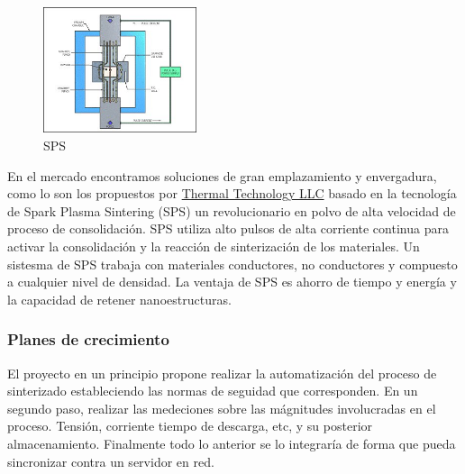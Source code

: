   \begin{figure}
  \vspace{-20px}  
  \begin{center}
    \includegraphics[width=0.4\textwidth]{../../Documentacion/Diagramas/image004.jpg}
  \end{center}
  \caption{SPS}
  \vspace{-20px}
  \end{figure}

  En el mercado encontramos soluciones de gran emplazamiento y envergadura, como lo son los propuestos por \href{''http://thermaltechnology.com/index.php?option=com_content&view=article&id=84''}{Thermal Technology LLC}
  basado en la tecnología de Spark Plasma Sintering (SPS) un revolucionario en polvo de alta velocidad de proceso de consolidación.
  SPS utiliza alto pulsos de alta corriente continua para activar la consolidación y la reacción de sinterización de los
  materiales. Un sistesma de SPS trabaja con materiales conductores, no conductores y compuesto a cualquier nivel de densidad.
  La ventaja de SPS es ahorro de tiempo y energía y la capacidad de retener nanoestructuras.



  \subsubsection{Planes de crecimiento}  
  El proyecto en un principio propone realizar la automatización del proceso de sinterizado estableciendo las normas de seguidad
  que corresponden. En un segundo paso, realizar las medeciones sobre las mágnitudes involucradas en el proceso. Tensión, corriente
  tiempo de descarga, etc, y su posterior almacenamiento. Finalmente todo lo anterior se lo integraría de forma que pueda sincronizar
  contra un servidor en red.

